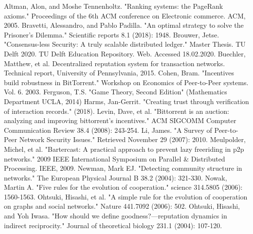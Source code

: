 \documentclass[11pt,a4paper]{report}
\theoremstyle{definition}
\theoremstyle{theorem}
\theoremstyle{proposition}
\theoremstyle{corollary}
\theoremstyle{lemma}
\theoremstyle{example}
\theoremstyle{remark}
\begin{document}
\begin{thebibliography}{9}
Altman, Alon, and Moshe Tennenholtz. "Ranking systems: the PageRank axioms." Proceedings of the 6th ACM conference on Electronic commerce. ACM, 2005.
Bravetti, Alessandro, and Pablo Padilla. "An optimal strategy to solve the Prisoner’s Dilemma." Scientific reports 8.1 (2018): 1948.
Brouwer, Jetse. "Consensus-less Security: A truly scalable distributed ledger." Master Thesis. TU Delft 2020. TU Delft Education Repository. Web. Accessed 18.02.2020.
Buechler, Matthew, et al. Decentralized reputation system for transaction networks. Technical report, University of Pennsylvania, 2015.
Cohen, Bram. "Incentives build robustness in BitTorrent." Workshop on Economics of Peer-to-Peer systems. Vol. 6. 2003.
Ferguson, T.S. "Game Theory, Second Edition" (Mathematics Department UCLA, 2014)
Harms, Jan-Gerrit. "Creating trust through verification of interaction records." (2018).
Levin, Dave, et al. "Bittorrent is an auction: analyzing and improving bittorrent's incentives." ACM SIGCOMM Computer Communication Review 38.4 (2008): 243-254.
Li, James. "A Survey of Peer-to-Peer Network Security Issues." Retrieved November 29 (2007): 2010.
Meulpolder, Michel, et al. "Bartercast: A practical approach to prevent lazy freeriding in p2p networks." 2009 IEEE International Symposium on Parallel \& Distributed Processing. IEEE, 2009.
Newman, Mark EJ. "Detecting community structure in networks." The European Physical Journal B 38.2 (2004): 321-330.
Nowak, Martin A. "Five rules for the evolution of cooperation." science 314.5805 (2006): 1560-1563.
Ohtsuki, Hisashi, et al. "A simple rule for the evolution of cooperation on graphs and social networks." Nature 441.7092 (2006): 502.
Ohtsuki, Hisashi, and Yoh Iwasa. "How should we define goodness?—reputation dynamics in indirect reciprocity." Journal of theoretical biology 231.1 (2004): 107-120.

\end{thebibliography}
\end{document}
